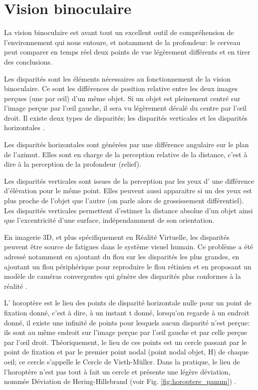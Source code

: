 	\section{Vision binoculaire}
	\par La vision binoculaire est avant tout un excellent outil de compréhension de l'environnement qui nous entoure, et notamment de la profondeur: le cerveau peut comparer en temps réel deux points de vue légèrement différents et en tirer des conclusions.
	
	\par Les disparités sont les éléments nécessaires au fonctionnement de la vision binoculaire. Ce sont les différences de position relative entre les deux images perçues (une par œil) d'un même objet. Si un objet est pleinement centré sur l'image perçue par l'œil gauche, il sera vu légèrement décalé du centre par l'œil droit.	Il existe deux types de disparités; les disparités verticales et les disparités horizontales \citep{devisme_optimisation_2004}.
	
	\par Les disparités horizontales sont générées par une différence angulaire sur le plan de l'azimut. Elles sont en charge de la perception relative de la distance, c'est à dire à la perception de la profondeur (relief).
	
	\par Les disparités verticales sont issues de la perception par les yeux d' une différence d'élévation pour le même point. Elles peuvent aussi apparaitre si un des yeux est plus proche de l'objet que l'autre (on parle alors de grossissement différentiel). Les disparités verticales permettent d'estimer la distance absolue d'un objet ainsi que l'excentricité d'une surface, indépendamment de son orientation.
	
	\par En imagerie 3D, et plus spécifiquement en Réalité Virtuelle, les disparités peuvent être source de fatigues dans le système visuel humain. Ce problème a été adressé notamment en ajoutant du flou sur les disparités les plus grandes, en ajoutant un flou périphérique pour reproduire le flou rétinien et en proposant un modèle de caméras convergentes qui génère des disparités plus conformes à la réalité \citep{aurat_immersion_2016}.
	
	\par L' horoptère est le lieu des points de disparité horizontale nulle pour un point de fixation donné, c'est à dire, à un instant t donné, lorsqu'on regarde à un endroit donné, il existe une infinité de points pour lesquels aucun disparité n'est perçue: ils sont au même endroit sur l'image perçue par l'œil gauche et par celle perçue par l'œil droit. Théoriquement, le lieu de ces points est un cercle passant par le point de fixation et par le premier point nodal (point nodal objet, H) de chaque oeil; ce cercle s'appelle le Cercle de Vieth-Müller. Dans la pratique, le lieu de l'horoptère n'est pas tout à fait un cercle et présente une légère déviation, nommée Déviation de Hering-Hillebrand (voir Fig. \ref{fig:horoptere_panum}) \citep{neveu_impact_2012}.
	
